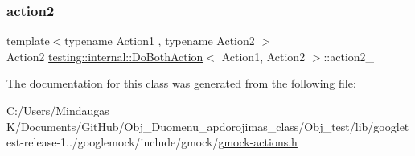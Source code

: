 \mbox{\label{classtesting_1_1internal_1_1_do_both_action_a414a3fe2381da32b235524338bbb592e}} 
\subsubsection{\texorpdfstring{action2\_}{action2\_}}
{\footnotesize\ttfamily template$<$typename Action1 , typename Action2 $>$ \\
Action2 \mbox{\hyperlink{classtesting_1_1internal_1_1_do_both_action}{testing\+::internal\+::\+Do\+Both\+Action}}$<$ Action1, Action2 $>$\+::action2\+\_\+\hspace{0.3cm}{\ttfamily [private]}}



The documentation for this class was generated from the following file\+:\begin{DoxyCompactItemize}
\item 
C\+:/\+Users/\+Mindaugas K/\+Documents/\+Git\+Hub/\+Obj\+\_\+\+Duomenu\+\_\+apdorojimas\+\_\+class/\+Obj\+\_\+test/lib/googletest-\/release-\/1../googlemock/include/gmock/\mbox{\hyperlink{_obj__test_2lib_2googletest-release-1_88_81_2googlemock_2include_2gmock_2gmock-actions_8h}{gmock-\/actions.\+h}}\end{DoxyCompactItemize}

